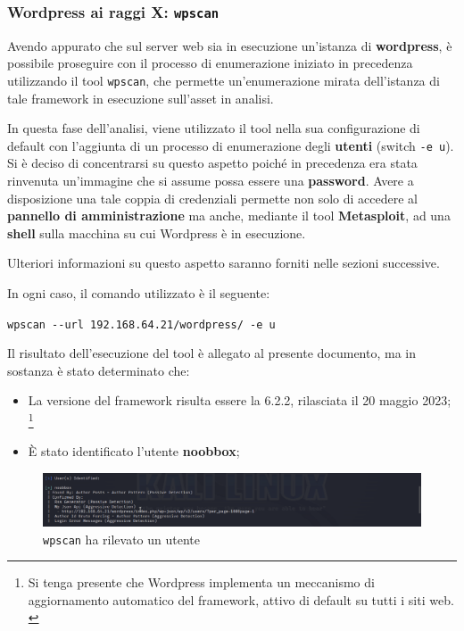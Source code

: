 \documentclass[a4paper, 12pt, oneside]{article}
\begin{document}
\newpage
\newpage
\newpage

\subsubsection{Wordpress ai raggi X: \texttt{wpscan}}

Avendo appurato che sul server web sia in esecuzione un'istanza di \textbf{wordpress}, è possibile proseguire con il processo di enumerazione iniziato in precedenza utilizzando il tool \texttt{wpscan}, che permette un'enumerazione mirata dell'istanza di tale framework in esecuzione sull'asset in analisi.

In questa fase dell'analisi, viene utilizzato il tool nella sua configurazione di default con l'aggiunta di un processo di enumerazione degli \textbf{utenti} (switch \texttt{-e u}). Si è deciso di concentrarsi su questo aspetto poiché in precedenza era stata rinvenuta un'immagine che si assume possa essere una \textbf{password}. Avere a disposizione una tale coppia di credenziali permette non solo di accedere al \textbf{pannello di amministrazione} ma anche, mediante il tool \textbf{Metasploit}, ad una \textbf{shell} sulla macchina su cui Wordpress è in esecuzione.

Ulteriori informazioni su questo aspetto saranno forniti nelle sezioni successive.

In ogni caso, il comando utilizzato è il seguente:

\begin{center}
    \texttt{wpscan -{}-url 192.168.64.21/wordpress/ -e u}
\end{center}

Il risultato dell'esecuzione del tool è allegato al presente documento, ma in sostanza è stato determinato che:

\begin{itemize}
    \item La versione del framework risulta essere la 6.2.2, rilasciata il 20 maggio 2023; \footnote{Si tenga presente che Wordpress implementa un meccanismo di aggiornamento automatico del framework, attivo di default su tutti i siti web. \cite{wordpress-autoupdate}}
    \item È stato identificato l'utente \textbf{noobbox}; 
\end{itemize}

\begin{figure}[h!]
    \centering
    \includegraphics[width=\textwidth]{img/wpscan_user.png}
    \caption{\texttt{wpscan} ha rilevato un utente}
\end{figure}
\end{document}
